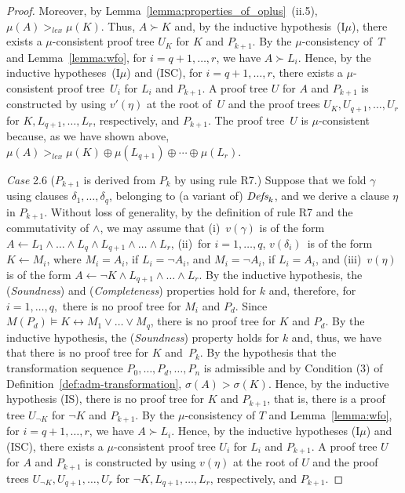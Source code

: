 \documentclass[english]{tlp}
\newcommand{\If}{\leftarrow}
\newcommand{\Iff}{\leftrightarrow}
\renewcommand{\mathit}{\displaystyle}
\newcommand{\Mathit}[1]{\mbox{\it #1}}
\begin{document}
\begin{proof}
Moreover, by
Lemma~\ref{lemma:properties_of_oplus}~(ii.5), $\mu(A)>_{\mathit lex}
\mu(K)$. Thus, $A\succ K$ and, by the inductive hypothesis~(I$\mu$), 
there exists a $\mu$-consistent proof tree $U_{K}$ for $K$
and $P_{k+1}$. By the $\mu$-consistency of~$T$ and
Lemma~\ref{lemma:wfo}, for \( i=q+1,\ldots,r \), we have $A \succ
L_i$. Hence, by the inductive hypotheses~(I$\mu$) and (ISC), 
for $i\!=q+1,\ldots,r$, there
exists a $\mu$-consistent proof tree~\(U_{i} \) for \( L_{i} \) and
\( P_{k+1} \). A proof tree $U$ for $A$ and $ P_{k+1}$ is
constructed by using $v'(\eta)$  at the root of~$U$ and the proof trees
$U_{K},U_{q+1},\ldots,U_r$ for $K,L_{q+1},\ldots,L_r$, respectively, and 
$P_{k+1}$. The proof tree~$U$ is
$\mu$-consistent because, as we have shown above,
$\mu(A)>_{\mathit lex}
\mu(K)\oplus\mu(L_{q+1}) \oplus\cdots\oplus\mu(L_r)$.

\medskip 

\noindent \emph{Case} 2.6 ($P_{k+1}$ is derived from $P_k$ by using
rule R7.) Suppose that we fold $\gamma$ using clauses
$\delta_1,\ldots,\delta_q$, belonging to (a variant of)
$\Mathit{Defs}_k$, and we derive a clause $\eta$ in $P_{k+1}$.
Without loss of generality, by the definition of rule R7 and the
commutativity of $\wedge$, we may assume that (i)~$v(\gamma)$ is of
the form $A\If L_1\wedge \ldots \wedge L_q \wedge L_{q+1}\wedge
\ldots \wedge L_r$, (ii)~for $i=1,\ldots,q$, $v(\delta_i)$~is of the
form $K\If M_i$, where $M_i=A_i$, if $L_i=\neg A_i$, and $M_i=\neg
A_i$, if $L_i=A_i$, and (iii)~$v(\eta)$ is of the form $A\If \neg K
\wedge L_{q+1}\wedge \ldots \wedge L_r$. By the inductive
hypothesis, the ({\em Soundness}) and ({\em Completeness})
properties hold for $k$ and, therefore, for $i=1,\ldots,q,$ there is
no proof tree for $M_i$ and $P_d$. Since $M(P_d)\models K \Iff M_1
\vee \ldots \vee M_q$, there is no proof tree for $K$ and $P_d$. By
the inductive hypothesis, the ({\em Soundness}) property holds for
$k$ and, thus, we have that there is no proof tree for $K$ and~$P_k$. 
By the hypothesis that the transformation sequence
$P_0,\ldots,P_d,\ldots,P_n$ is admissible and by Condition (3) of
Definition~\ref{def:adm-transformation}, $\sigma(A)> \sigma(K)$.
Hence, by the inductive hypothesis (IS), there is no proof tree for
$K$ and $P_{k+1}$, that is, there is a proof tree $U_{\neg K}$ for
$\neg K$ and $P_{k+1}$. By the $\mu$-consistency of $T$ and
Lemma~\ref{lemma:wfo}, for \( i=q\!+\!1,\ldots ,r \), we have $A \succ
L_i$. Hence, by the inductive hypotheses (I$\mu$) and (ISC), there
exists a $\mu$-consistent proof tree \(U_{i} \) for \( L_{i} \) and
\( P_{k+1} \). A proof tree $U$ for $A$ and $ P_{k+1}$ is
constructed by using $v(\eta)$  at the root of $U$ and the proof trees $U_{\neg
K},U_{q+1},\ldots,U_r$ for $\neg K,L_{q+1},\ldots,L_r$, respectively,
and $P_{k+1}$.


\end{proof}
\end{document}
